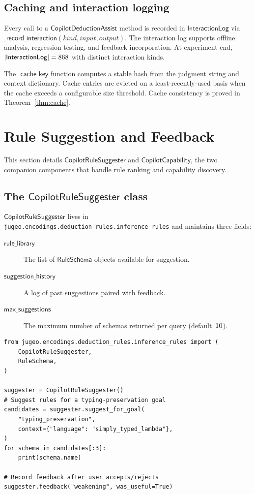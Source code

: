 \documentclass[11pt]{article}
\newcommand{\CDA}{\ensuremath{\mathsf{CopilotDeductionAssist}}}
\newcommand{\CRS}{\ensuremath{\mathsf{CopilotRuleSuggester}}}
\newcommand{\CC}{\ensuremath{\mathsf{CopilotCapability}}}
\newcommand{\RS}{\ensuremath{\mathsf{RuleSchema}}}
\newcommand{\IL}{\ensuremath{\mathsf{InteractionLog}}}
\newcommand{\cacheKey}{\ensuremath{\mathsf{\_cache\_key}}}
\newcommand{\recordInter}{\ensuremath{\mathsf{\_record\_interaction}}}
\begin{document}
\subsection{Caching and interaction logging}\label{ssec:caching}

Every call to a $\CDA$ method is recorded in $\IL$ via
$\recordInter(\mathit{kind}, \mathit{input}, \mathit{output})$.
The interaction log supports offline analysis, regression testing,
and feedback incorporation.  At experiment end, $|\IL| =
\ppLXXXVIIinteractionLogSize{}$ with
\ppLXXXVIIuniqueInteractionKinds{} distinct interaction kinds.

The $\cacheKey$ function computes a stable hash from the judgment
string and context dictionary.  Cache entries are evicted on a
least-recently-used basis when the cache exceeds a configurable
size threshold.  Cache consistency is proved in
Theorem~\ref{thm:cache}.


\section{Rule Suggestion and Feedback}\label{sec:suggestion}

This section details $\CRS$ and $\CC$, the two companion
components that handle rule ranking and capability discovery.

\subsection{The \texorpdfstring{$\CRS$}{CopilotRuleSuggester}
  class}\label{ssec:crs}

$\CRS$ lives in
\texttt{jugeo.encodings.deduction\_rules.inference\_rules} and
maintains three fields:
\begin{description}
  \item[$\mathsf{rule\_library}$] The list of $\RS$ objects
    available for suggestion.
  \item[$\mathsf{suggestion\_history}$] A log of past suggestions
    paired with feedback.
  \item[$\mathsf{max\_suggestions}$] The maximum number of schemas
    returned per query (default~$10$).
\end{description}

\begin{lstlisting}[style=jugeo-python,
  caption={$\CRS$ instantiation and suggestion.},label=lst:crs]
from jugeo.encodings.deduction_rules.inference_rules import (
    CopilotRuleSuggester,
    RuleSchema,
)

suggester = CopilotRuleSuggester()
# Suggest rules for a typing-preservation goal
candidates = suggester.suggest_for_goal(
    "typing_preservation",
    context={"language": "simply_typed_lambda"},
)
for schema in candidates[:3]:
    print(schema.name)

# Record feedback after user accepts/rejects
suggester.feedback("weakening", was_useful=True)
\end{lstlisting}
\end{document}
